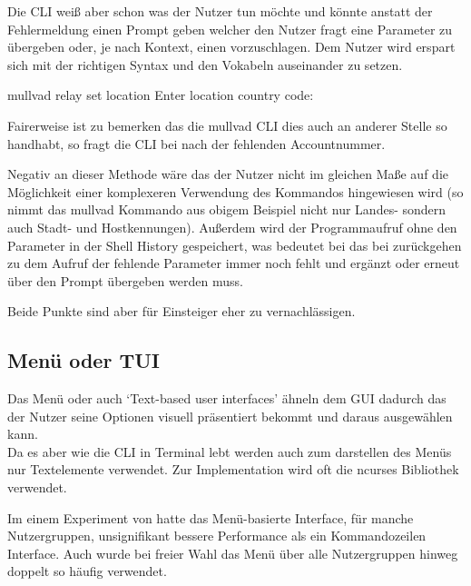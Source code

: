 \documentclass[oneside,bibliography=totocnumbered,BCOR=5mm]{scrbook}
\newenvironment{code}{\captionsetup{type=listing, skip=0pt}}{}
\begin{document}
Die CLI weiß aber schon was der Nutzer tun möchte und könnte anstatt der
Fehlermeldung einen Prompt geben welcher den Nutzer fragt eine Parameter zu
übergeben oder, je nach Kontext, einen vorzuschlagen. Dem Nutzer wird erspart
sich mit der richtigen Syntax und den Vokabeln auseinander zu setzen.


\begin{code}
  \begin{shellcode}
mullvad relay set location
Enter location country code:
  \end{shellcode}
  \medskip
\end{code}

Fairerweise ist zu bemerken das die mullvad CLI dies auch an anderer Stelle so handhabt, so fragt die CLI bei  nach der fehlenden Accountnummer.

Negativ an dieser Methode wäre das der Nutzer nicht im gleichen Maße auf die
Möglichkeit einer komplexeren Verwendung des Kommandos hingewiesen wird (so
nimmt das mullvad Kommando aus obigem Beispiel nicht nur Landes- sondern auch
Stadt- und Hostkennungen). Außerdem wird der Programmaufruf ohne den Parameter
in der Shell History gespeichert, was bedeutet bei das bei zurückgehen zu dem
Aufruf der fehlende Parameter immer noch fehlt und ergänzt oder erneut über den
Prompt übergeben werden muss. %

Beide Punkte sind aber für Einsteiger eher zu vernachlässigen.

\subsection{Menü oder TUI}

Das Menü oder auch `Text-based user interfaces' ähneln dem GUI dadurch das der
Nutzer seine Optionen visuell präsentiert bekommt und daraus ausgewählen kann.
\\
Da es aber wie die CLI in Terminal lebt werden auch zum darstellen des Menüs
nur Textelemente verwendet. Zur Implementation wird oft die ncurses Bibliothek
verwendet.

\bigskip

Im einem Experiment von \cite{Westerman_1997} hatte das Menü-basierte
Interface, für manche Nutzergruppen, unsignifikant bessere Performance als
ein Kommandozeilen Interface. Auch wurde bei freier Wahl das Menü über alle
Nutzergruppen hinweg doppelt so häufig verwendet.
\end{document}
